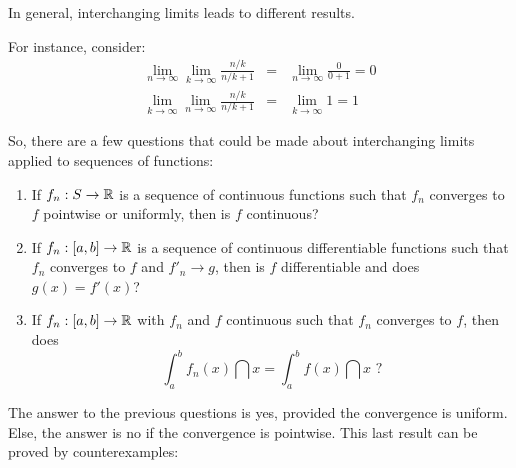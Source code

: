 \begin{remark}
    In general, interchanging limits leads to different results.    
\end{remark}

\begin{eg}
    For instance, consider:
    \begin{eqnarray*}
        \lim \limits_{n \to \infty} \lim \limits_{k \to \infty} \frac{n/k}{n/k + 1} &=& \lim \limits_{n \to \infty} \frac{0}{0+1} = 0 \\
        \lim \limits_{k \to \infty} \lim \limits_{n \to \infty} \frac{n/k}{n/k + 1} &=& \lim \limits_{k \to \infty} 1 = 1
    \end{eqnarray*}
\end{eg}

So, there are a few questions that could be made about interchanging limits applied to sequences of functions:
\begin{enumerate}
    \item If $f_n: S \to \mathbb{R}$ is a sequence of continuous functions such that $f_n$ converges to $f$ pointwise or uniformly, then is $f$ continuous?
    \item If $f_n: [a,b] \to \mathbb{R}$ is a sequence of continuous differentiable functions such that $f_n$ converges to $f$ and $f'_n \to g$, then is $f$ differentiable and does $g(x) = f'(x)$?
    \item If $f_n: [a,b] \to \mathbb{R}$ with $f_n$ and $f$ continuous such that $f_n$ converges to $f$, then does
        \begin{equation*}
            \int_a^b f_n(x) \dint x = \int_a^b f(x) \dint x \text{ ?}
        \end{equation*}
\end{enumerate}

The answer to the previous questions is yes, provided the convergence is uniform. Else, the answer is no if the convergence is pointwise. This last result can be proved by counterexamples:

